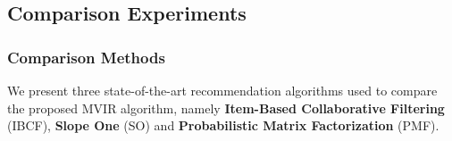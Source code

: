 \documentclass{beamer}
\begin{document}
\subsection{Comparison Experiments}
\begin{frame}
\frametitle{Comparison Methods}
\vskip -0.2in
We present three state-of-the-art recommendation algorithms used to compare the proposed MVIR algorithm, namely \textbf{Item-Based Collaborative Filtering} (IBCF), \textbf{Slope One} (SO) and \textbf{Probabilistic Matrix Factorization} (PMF).




\end{frame}
\end{document}
